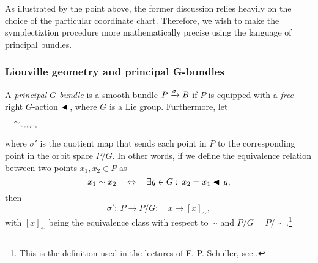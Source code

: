 As illustrated by the point above, the former discussion relies heavily on the choice of the particular coordinate chart. Therefore, we wish to make the symplectiztion procedure more mathematically precise using the language of principal bundles.

\subsubsection{Liouville geometry and principal G-bundles}
A \emph{principal} \(G\)\emph{-bundle} is a smooth bundle \(P\xrightarrow[]{\sigma}B\) if \(P\) is equipped with a \emph{free} right \(G\)-action \(\blacktriangleleft\,\), where \(G\) is a Lie group. Furthermore, let  
\begin{center}
    \(\quad \cong_\text{\tiny bundle} \quad \)
\end{center}
where \(\sigma'\) is the quotient map that sends each point in \(P\) to the corresponding point in the orbit space \(P/G\). In other words, if we define the equivalence relation between two points \(x_1, x_2 \in P\) as
\begin{equation}
     x_1 \sim x_2 \quad \Leftrightarrow \quad \exists g \in G:\: x_2 = x_1 \blacktriangleleft\,g,
\end{equation}
then 
\begin{equation}
     \sigma':\: P \to P/G:\quad x \mapsto [x]_\sim,
\end{equation}
with \([x]_\sim\) being the equivalence class with respect to \(\sim\) and \(P/G = P/\sim\).\footnote{This is the definition used in the lectures of F. P. Schuller, see \cite{Schuller2014}.}

